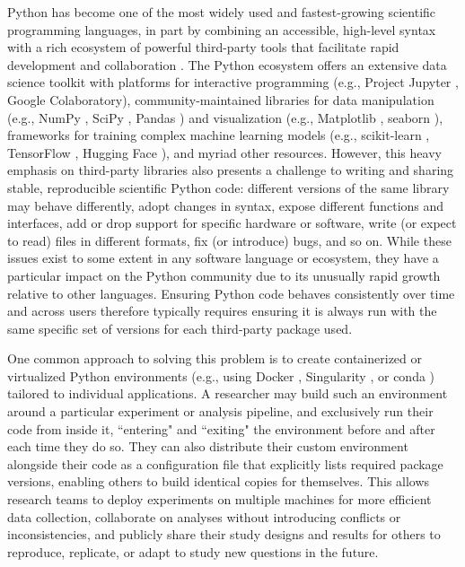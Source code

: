 \documentclass[preprint,12pt, a4paper]{elsarticle}
\begin{document}
Python \cite{vanR95} has become one of the most widely used and
fastest-growing scientific programming languages, in part by combining
an accessible, high-level syntax with a rich ecosystem of powerful
third-party tools that facilitate rapid development and collaboration
\cite{MullEtal15}.  The Python ecosystem offers an extensive data
science toolkit with platforms for interactive programming (e.g.,
Project Jupyter \cite{KluyEtal16}, Google Colaboratory),
community-maintained libraries for data manipulation (e.g., NumPy
\cite{HarrEtal20}, SciPy \cite{VirtEtal20}, Pandas \cite{McKi10}) and
visualization (e.g., Matplotlib \cite{Hunt07}, seaborn \cite{Wask21}),
frameworks for training complex machine learning models (e.g.,
scikit-learn \cite{PedrEtal11}, TensorFlow \cite{AbadEtal15}, Hugging
Face \cite{WolfEtal20}), and myriad other resources.  However, this
heavy emphasis on third-party libraries also presents a challenge to
writing and sharing stable, reproducible scientific Python code:
different versions of the same library may behave differently, adopt
changes in syntax, expose different functions and interfaces, add or
drop support for specific hardware or software, write (or expect to
read) files in different formats, fix (or introduce) bugs, and so on.
While these issues exist to some extent in any software language or
ecosystem, they have a particular impact on the Python community due
to its unusually rapid growth relative to other languages.  Ensuring
Python code behaves consistently over time and across users therefore
typically requires ensuring it is always run with the same specific
set of versions for each third-party package used.

One common approach to solving this problem is to create containerized
or virtualized Python environments (e.g., using Docker \cite{Merk14},
Singularity \cite{KurtEtal17}, or conda \cite{Anac12}) tailored to
individual applications.  A researcher may build such an environment
around a particular experiment or analysis pipeline, and exclusively
run their code from inside it, ``entering" and ``exiting" the
environment before and after each time they do so.  They can also
distribute their custom environment alongside their code as a
configuration file that explicitly lists required package versions,
enabling others to build identical copies for themselves.  This allows
research teams to deploy experiments on multiple machines for more
efficient data collection, collaborate on analyses without introducing
conflicts or inconsistencies, and publicly share their study designs
and results for others to reproduce, replicate, or adapt to study new
questions in the future.
\end{document}
